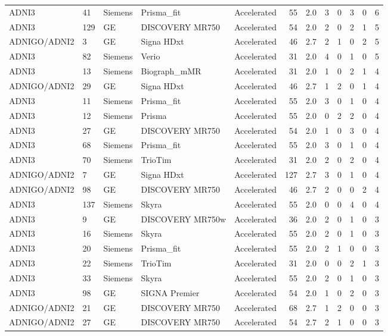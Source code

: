 \documentclass{article}
\begin{document}
\begin{landscape}
\begin{longtable}{lllllrrrrrrr}
ADNI3 & 41 & Siemens & Prisma\_fit & Accelerated & 55 & 2.0 & 3 & 0 & 3 & 0 & 6 \\
ADNI3 & 129 & GE & DISCOVERY MR750 & Accelerated & 54 & 2.0 & 2 & 0 & 2 & 1 & 5 \\
ADNIGO/ADNI2 & 3 & GE & Signa HDxt & Accelerated & 46 & 2.7 & 2 & 1 & 0 & 2 & 5 \\
ADNI3 & 82 & Siemens & Verio & Accelerated & 31 & 2.0 & 4 & 0 & 1 & 0 & 5 \\
ADNI3 & 13 & Siemens & Biograph\_mMR & Accelerated & 31 & 2.0 & 1 & 0 & 2 & 1 & 4 \\
ADNIGO/ADNI2 & 29 & GE & Signa HDxt & Accelerated & 46 & 2.7 & 1 & 2 & 0 & 1 & 4 \\
ADNI3 & 11 & Siemens & Prisma\_fit & Accelerated & 55 & 2.0 & 3 & 0 & 1 & 0 & 4 \\
ADNI3 & 12 & Siemens & Prisma & Accelerated & 55 & 2.0 & 0 & 2 & 2 & 0 & 4 \\
ADNI3 & 27 & GE & DISCOVERY MR750 & Accelerated & 54 & 2.0 & 1 & 0 & 3 & 0 & 4 \\
ADNI3 & 68 & Siemens & Prisma\_fit & Accelerated & 55 & 2.0 & 3 & 0 & 1 & 0 & 4 \\
ADNI3 & 70 & Siemens & TrioTim & Accelerated & 31 & 2.0 & 2 & 0 & 2 & 0 & 4 \\
ADNIGO/ADNI2 & 7 & GE & Signa HDxt & Accelerated & 127 & 2.7 & 3 & 0 & 1 & 0 & 4 \\
ADNIGO/ADNI2 & 98 & GE & DISCOVERY MR750 & Accelerated & 46 & 2.7 & 2 & 0 & 0 & 2 & 4 \\
ADNI3 & 137 & Siemens & Skyra & Accelerated & 55 & 2.0 & 0 & 0 & 4 & 0 & 4 \\
ADNI3 & 9 & GE & DISCOVERY MR750w & Accelerated & 36 & 2.0 & 2 & 0 & 1 & 0 & 3 \\
ADNI3 & 16 & Siemens & Skyra & Accelerated & 55 & 2.0 & 2 & 0 & 1 & 0 & 3 \\
ADNI3 & 20 & Siemens & Prisma\_fit & Accelerated & 55 & 2.0 & 2 & 1 & 0 & 0 & 3 \\
ADNI3 & 22 & Siemens & TrioTim & Accelerated & 31 & 2.0 & 0 & 0 & 2 & 1 & 3 \\
ADNI3 & 33 & Siemens & Skyra & Accelerated & 55 & 2.0 & 2 & 0 & 1 & 0 & 3 \\
ADNI3 & 98 & GE & SIGNA Premier & Accelerated & 54 & 2.0 & 1 & 0 & 2 & 0 & 3 \\
ADNIGO/ADNI2 & 21 & GE & DISCOVERY MR750 & Accelerated & 68 & 2.7 & 1 & 2 & 0 & 0 & 3 \\
ADNIGO/ADNI2 & 27 & GE & DISCOVERY MR750 & Accelerated & 54 & 2.7 & 2 & 1 & 0 & 0 & 3 \\

\end{longtable}
\end{landscape}
\end{document}
